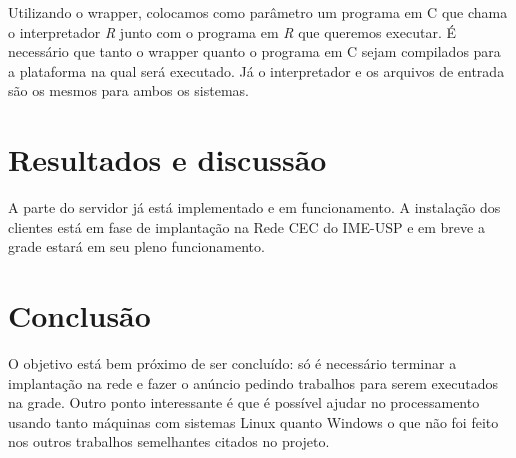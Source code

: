 \documentclass[b1,portrait]{sciposter}
\begin{document}
\begin{multicols}{2}
Utilizando o wrapper, colocamos como parâmetro um programa em C 
que chama o interpretador \textit{R} junto com o programa em \textit{R}
que queremos executar. É necessário que tanto o wrapper
quanto o programa em C sejam compilados para a plataforma na qual será executado. 
Já o interpretador e os arquivos de entrada são os mesmos para ambos os sistemas.

\section{Resultados e discussão}

A parte do servidor já está implementado e em funcionamento. A instalação
dos clientes está em fase de implantação na Rede CEC do IME-USP e em breve 
a grade estará em seu pleno funcionamento.

\section{Conclusão}
 
O objetivo está bem próximo de ser concluído: só é necessário terminar a implantação
na rede e fazer o anúncio pedindo trabalhos para serem executados na grade. Outro ponto
interessante é que é possível ajudar no processamento usando tanto máquinas com sistemas
Linux quanto Windows o que não foi feito nos outros trabalhos semelhantes citados no projeto.  
 






\end{multicols}
\end{document}
